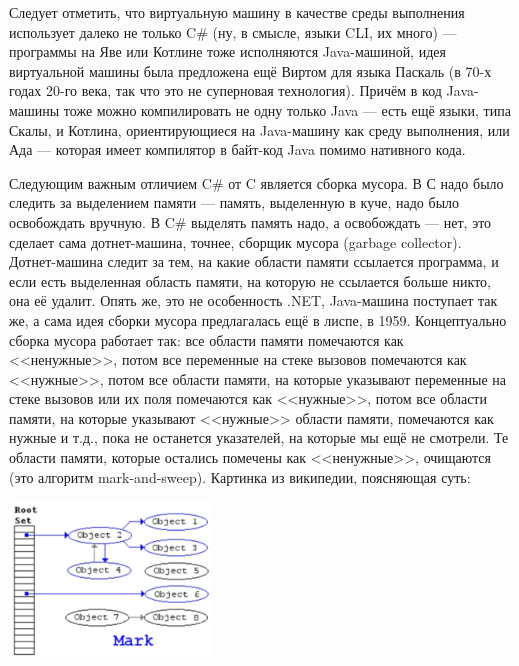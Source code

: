 \documentclass{../../text-style}
\begin{document}
Следует отметить, что виртуальную машину в качестве среды выполнения использует далеко не только C\# (ну, в смысле, языки CLI, их много) --- программы на Яве или Котлине тоже исполняются Java-машиной, идея виртуальной машины была предложена ещё Виртом для языка Паскаль (в 70-х годах 20-го века, так что это не суперновая технология). Причём в код Java-машины тоже можно компилировать не одну только Java --- есть ещё языки, типа Скалы, и Котлина, ориентирующиеся на Java-машину как среду выполнения, или Ада --- которая имеет компилятор в байт-код Java помимо нативного кода.

Следующим важным отличием C\# от C является сборка мусора. В С надо было следить за выделением памяти --- память, выделенную в куче, надо было освобождать вручную. В C\# выделять память надо, а освобождать --- нет, это сделает сама дотнет-машина, точнее, сборщик мусора (garbage collector). Дотнет-машина следит за тем, на какие области памяти ссылается программа, и если есть выделенная область памяти, на которую не ссылается больше никто, она её удалит. Опять же, это не особенность .NET, Java-машина поступает так же, а сама идея сборки мусора предлагалась ещё в лиспе, в 1959. Концептуально сборка мусора работает так: все области памяти помечаются как <<ненужные>>, потом все переменные на стеке вызовов помечаются как <<нужные>>, потом все области памяти, на которые указывают переменные на стеке вызовов или их поля помечаются как <<нужные>>, потом все области памяти, на которые указывают <<нужные>> области памяти, помечаются как нужные и т.д., пока не останется указателей, на которые мы ещё не смотрели. Те области памяти, которые остались помечены как <<ненужные>>, очищаются (это алгоритм mark-and-sweep). Картинка из википедии, поясняющая суть:

\begin{center}
    \includegraphics[width=0.4\textwidth]{markAndSweep.png}
\end{center}
\end{document}
